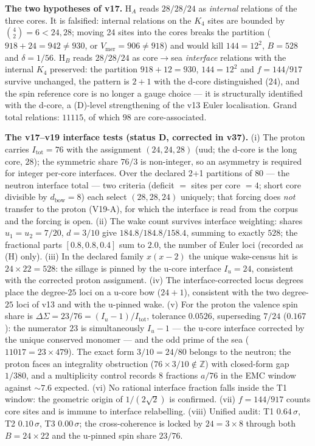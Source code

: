 \documentclass[11pt,a4paper]{article}
\theoremstyle{plain}
\theoremstyle{definition}
\theoremstyle{remark}
\begin{document}
\textbf{The two hypotheses of v17.} H$_{A}$ reads $28/28/24$ as \emph{internal} relations of the three cores. It is \textcolor{negativered}{falsified}: internal relations on the $K_{4}$ sites are bounded by $\binom{4}{2}=6<24,28$; moving 24 sites into the cores breaks the partition ($918+24=942\neq930$, or $V_{\mathrm{mer}}=906\neq918$) and would kill $144=12^{2}$, $B=528$ and $\delta=1/56$. H$_{B}$ reads $28/28/24$ as core$\to$sea \emph{interface} relations with the internal $K_{4}$ preserved: the partition $918+12=930$, $144=12^{2}$ and $f=144/917$ survive unchanged, the pattern is $2+1$ with the d-core distinguished ($24$), and the spin reference core is no longer a gauge choice --- it is structurally identified with the d-core, a (D)-level strengthening of the v13 Euler localisation. Grand total relations: $11115$, of which $98$ are core-associated.

\textbf{The v17--v19 interface tests (status D, corrected in v37).} (i) The proton carries $I_{\mathrm{tot}}=76$ with the assignment $(24,24,28)$ (uud; the d-core is the long core, $28$); the symmetric share $76/3$ is non-integer, so an asymmetry is required for integer per-core interfaces. Over the declared 2+1 partitions of $80$ --- the neutron interface total --- two criteria (deficit $=$ sites per core $=4$; short core divisible by $d_{\mathrm{bow}}=8$) each select $(28,28,24)$ uniquely; that forcing does \emph{not} transfer to the proton (V19-A), for which the interface is read from the corpus and the forcing is open. (ii) The wake count survives interface weighting: shares $u_{1}=u_{2}=7/20$, $d=3/10$ give $184.8/184.8/158.4$, summing to exactly $528$; the fractional parts $[0.8,0.8,0.4]$ sum to $2.0$, the number of Euler loci (recorded as (H) only). (iii) In the declared family $x(x-2)$ the unique wake-census hit is $24\times22=528$: the sillage is pinned by the u-core interface $I_u=24$, consistent with the corrected proton assignment. (iv) The interface-corrected locus degrees place the degree-$25$ loci on a u-core bow ($24+1$), consistent with the two degree-$25$ loci of v13 and with the u-pinned wake. (v) For the proton the valence spin share is $\Delta\Sigma=23/76=(I_u-1)/I_{\mathrm{tot}}$, tolerance $0.0526$, superseding $7/24$ ($0.167$): the numerator $23$ is simultaneously $I_u-1$ --- the u-core interface corrected by the unique conserved monomer --- and the odd prime of the sea ($11017=23\times479$). The exact form $3/10=24/80$ belongs to the neutron; the proton faces an integrality obstruction ($76\times3/10\notin\mathbb{Z}$) with closed-form gap $1/380$, and a multiplicity control records $8$ fractions $a/76$ in the EMC window against $\sim7.6$ expected. (vi) No rational interface fraction falls inside the T1 window: the geometric origin of $1/(2\sqrt{2})$ is confirmed. (vii) $f=144/917$ counts core sites and is immune to interface relabelling. (viii) Unified audit: T1 $0.64\,\sigma$, T2 $0.10\,\sigma$, T3 $0.00\,\sigma$; the cross-coherence is locked by $24=3\times8$ through both $B=24\times22$ and the u-pinned spin share $23/76$.
\end{document}
